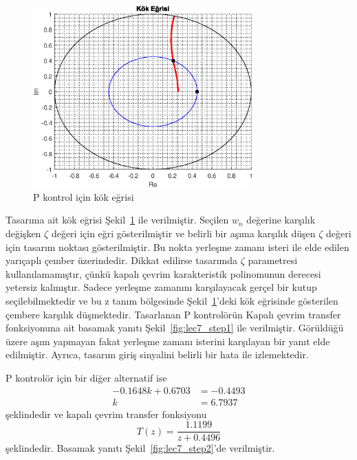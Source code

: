 \begin{figure}[!htb]
    \centering
    \includegraphics[width=0.75\textwidth]{img/lec7_rlocus1}
    \caption{P kontrol için kök eğrisi}
    \label{fig:lec7_rlocus1}
\end{figure}
Tasarıma ait kök eğrisi Şekil~\ref{fig:lec7_rlocus1} ile verilmiştir. Seçilen $w_n$ değerine karşılık değişken $\zeta$ değeri için eğri gösterilmiştir ve belirli bir aşıma karşılık düşen $\zeta$ değeri için tasarım noktası gösterilmiştir. Bu nokta yerleşme zamanı isteri ile elde edilen yarıçaplı çember üzerindedir. Dikkat edilirse tasarımda $\zeta$ parametresi kullanılamamıştır, çünkü kapalı çevrim karakteristik polinomunun derecesi yetersiz kalmıştır. Sadece yerleşme zamanını karşılayacak gerçel bir kutup seçilebilmektedir ve bu z tanım bölgesinde Şekil~\ref{fig:lec7_rlocus1}'deki kök eğrisinde gösterilen çembere karşılık düşmektedir. Tasarlanan P kontrolörün Kapalı çevrim transfer fonksiyonuna ait basamak yanıtı Şekil~\ref{fig:lec7_step1} ile verilmiştir. Görüldüğü üzere aşım yapmayan fakat yerleşme zamanı isterini karşılayan bir yanıt elde edilmiştir. Ayrıca, tasarım giriş sinyalini belirli bir hata ile izlemektedir.

P kontrolör için bir diğer alternatif ise 
\begin{equation}
\begin{split}
    -0.1648k+0.6703&=-0.4493\\
    k&=6.7937
\end{split}
\end{equation}
şeklindedir ve kapalı çevrim transfer fonksiyonu
\begin{equation}
    T(z)=\frac{1.1199}{z + 0.4496}
\end{equation}
şeklindedir. Basamak yanıtı Şekil~\ref{fig:lec7_step2}'de verilmiştir.

